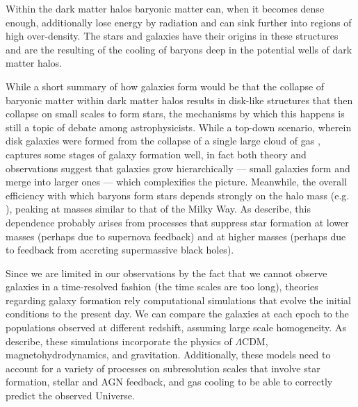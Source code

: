Within the dark matter halos baryonic matter can, when it becomes dense enough, additionally lose energy by radiation and can sink further into regions of high over-density. 
The stars and galaxies have their origins in these structures and are the resulting of the cooling of baryons deep in the potential wells of dark matter halos.

While a short summary of how galaxies form would be that the collapse of baryonic matter within dark matter halos results in disk-like structures that then collapse on small scales to form stars, the mechanisms by which this happens is still a topic of debate among astrophysicists. While a top-down scenario, wherein disk galaxies were formed from the collapse of a single large cloud of gas \citep{1962ApJ...136..748E}, captures some stages of galaxy formation well, in fact both theory and observations suggest that galaxies grow hierarchically --- small galaxies form and merge into larger ones --- which complexifies the picture. Meanwhile, the overall efficiency with which baryons form stars depends strongly on the halo mass (e.g. \citealt{behroozi_comprehensive_2010}), peaking at masses similar to that of the Milky Way. As \citet{somerville15a} describe, this dependence probably arises from processes that suppress star formation at lower masses (perhaps due to supernova feedback) and at higher masses (perhaps due to feedback from accreting supermassive black holes).


Since we are limited in our observations by the fact that we cannot observe galaxies in a time-resolved fashion (the time scales are too long), theories regarding galaxy formation rely computational simulations that evolve the initial conditions to the present day. We can compare the galaxies at each epoch to the populations observed at different redshift, assuming large scale homogeneity. As \citet{somerville15a} describe, these simulations incorporate the physics of $\Lambda$CDM, magnetohydrodynamics, and gravitation. Additionally, these models need to account for a variety of processes on subresolution scales that involve star formation, stellar and AGN feedback, and gas cooling to be able to correctly predict the observed Universe.\\

